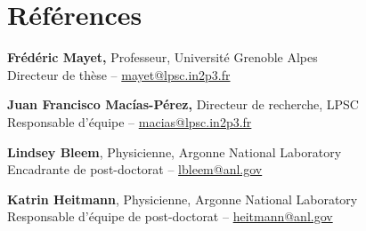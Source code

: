 \section{Références}\label{references}

\textbf{Fr\'ed\'eric Mayet,}
    Professeur, Universit\'e Grenoble Alpes \\
    Directeur de thèse -- \url{mayet@lpsc.in2p3.fr}

\textbf{Juan Francisco Mac\'ias-P\'erez,}
    Directeur de recherche, LPSC \\
    Responsable d'équipe -- \url{macias@lpsc.in2p3.fr}

\textbf{Lindsey Bleem},
    Physicienne, Argonne National Laboratory \\
    Encadrante de post-doctorat -- \url{lbleem@anl.gov}

\textbf{Katrin Heitmann},
    Physicienne, Argonne National Laboratory \\
    Responsable d'équipe de post-doctorat -- \url{heitmann@anl.gov}
